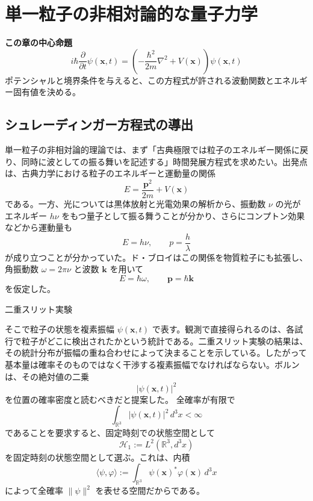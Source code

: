 \section{単一粒子の非相対論的な量子力学}

\noindent\textbf{この章の中心命題}
\[
\boxed{
i\hbar\frac{\partial}{\partial t}\psi(\mathbf{x},t)
=
\left(
-\frac{\hbar^2}{2m}\nabla^2+V(\mathbf{x})
\right)\psi(\mathbf{x},t)
}
\]
ポテンシャルと境界条件を与えると、この方程式が許される波動関数とエネルギー固有値を決める。

\subsection{シュレーディンガー方程式の導出}
単一粒子の非相対論的理論では、まず「古典極限では粒子のエネルギー関係に戻り、同時に波としての振る舞いを記述する」時間発展方程式を求めたい。出発点は、古典力学における粒子のエネルギーと運動量の関係
\begin{equation}
    E = \frac{\mathbf{p}^2}{2m} + V(\mathbf{x})
\end{equation}
である。一方、光については黒体放射と光電効果の解析から、振動数 $\nu$ の光がエネルギー $h\nu$ をもつ量子として振る舞うことが分かり、さらにコンプトン効果などから運動量も
\[
E = h\nu,\qquad p=\frac{h}{\lambda}
\]
が成り立つことが分かっていた。ド・ブロイはこの関係を物質粒子にも拡張し、角振動数 $\omega=2\pi\nu$ と波数 $\mathbf{k}$ を用いて
\[
E = \hbar \omega,\qquad \mathbf{p} = \hbar \mathbf{k}
\]
を仮定した。

\begin{experimentalfact}{二重スリット実験}
\end{experimentalfact}

そこで粒子の状態を複素振幅 $\psi(\mathbf{x},t)$ で表す。観測で直接得られるのは、各試行で粒子がどこに検出されたかという統計である。二重スリット実験の結果は、その統計分布が振幅の重ね合わせによって決まることを示している。したがって基本量は確率そのものではなく干渉する複素振幅でなければならない。ボルンは、その絶対値の二乗
\[
|\psi(\mathbf{x},t)|^2
\]
を位置の確率密度と読むべきだと提案した。
全確率が有限で
\[
\int_{\mathbb{R}^3} |\psi(\mathbf{x},t)|^2\,d^3x < \infty
\]
であることを要求すると、固定時刻での状態空間として
\[
\mathcal{H}_1 := L^2(\mathbb{R}^3,d^3x)
\]
を固定時刻の状態空間として選ぶ。これは、内積
\[
\langle \psi,\varphi\rangle
:=
\int_{\mathbb{R}^3}\psi(\mathbf{x})^*\varphi(\mathbf{x})\,d^3x
\]
によって全確率 $\|\psi\|^2$ を表せる空間だからである。

